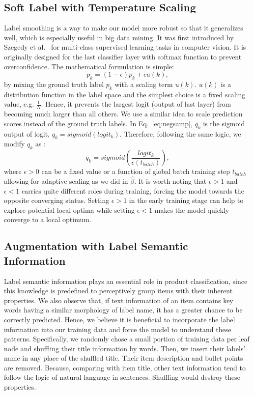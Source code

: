\documentclass[11pt,dvipsnames]{article}
\begin{document}
\subsection{Soft Label with Temperature Scaling}
Label smoothing is a way to make our model more robust so that it generalizes well, which is especially useful in big data mining. It was first introduced by Szegedy et al.~\cite{szegedy2016rethinking} for multi-class supervised learning tasks in computer vision. It is originally designed for the last classifier layer with softmax function to prevent overconfidence. The mathematical formulation is simple:
\begin{equation}
    p_k=(1-\epsilon)p_k+\epsilon u(k),
\end{equation}
by mixing the ground truth label $p_k$ with a scaling term $u(k)$. $u(k)$ is a distribution function in the label space and the simplest choice is a fixed scaling value, e.g. $\frac{1}{N}$. Hence, it prevents the largest logit (output of last layer) from becoming much larger than all others. We use a similar idea to scale prediction scores instead of the ground truth labels. In Eq.~\ref{eq:negsamp}, $q_k$ is the sigmoid output of logit, $q_k=sigmoid(logit_k)$. Therefore, following the same logic, we modify $q_k$ as :
\begin{equation}
    q_k=sigmoid(\frac{logit_k}{\epsilon(t_{batch})}),
\end{equation}
where $\epsilon>0$ can be a fixed value or a function of global batch training step $t_{batch}$ allowing for adaptive scaling as we did in $\hat{\beta}$. It is worth noting that $\epsilon>1$ and $\epsilon<1$ carries quite different roles during training, forcing the model towards the opposite converging status. Setting $\epsilon>1$ in the early training stage can help to explore potential local optima while setting $\epsilon<1$ makes the model quickly converge to a local optimum.


\subsection{Augmentation with Label Semantic Information}
Label semantic information plays an essential role in product classification, since this knowledge is predefined to perceptively group items with their inherent properties. We also observe that, if text information of an item contains key words having a similar morphology of label name, it has a greater chance to be correctly predicted. Hence, we believe it is beneficial to incorporate the label information into our training data and force the model to understand these patterns. 
Specifically, we randomly chose a small portion of training data per leaf node and shuffling their title information by words. Then, we insert their labels' name in any place of the shuffled title. Their item description and bullet points are removed. Because, comparing with item title, other text information tend to follow the logic of natural language in sentences. Shuffling would destroy these properties.
\end{document}
